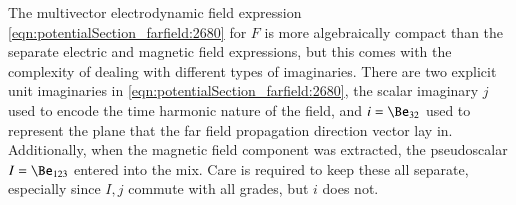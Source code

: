 {The multivector electrodynamic field expression
\cref{eqn:potentialSection_farfield:2680} for
\( F \) is more algebraically compact than the separate electric and magnetic field expressions, but this comes with the complexity of dealing with different types of imaginaries.
There are two explicit unit imaginaries in \cref{eqn:potentialSection_farfield:2680}, the scalar imaginary \( j \) used to encode the time harmonic nature of the field, and \( i = \Be_{32} \) used to represent the plane that the far field propagation direction vector lay in.
Additionally, when the magnetic field component was extracted, the pseudoscalar \( I = \Be_{123} \) entered into the mix.
Care is required to keep these all separate, especially since \( I, j \) commute with all grades, but \( i \) does not.
} %

